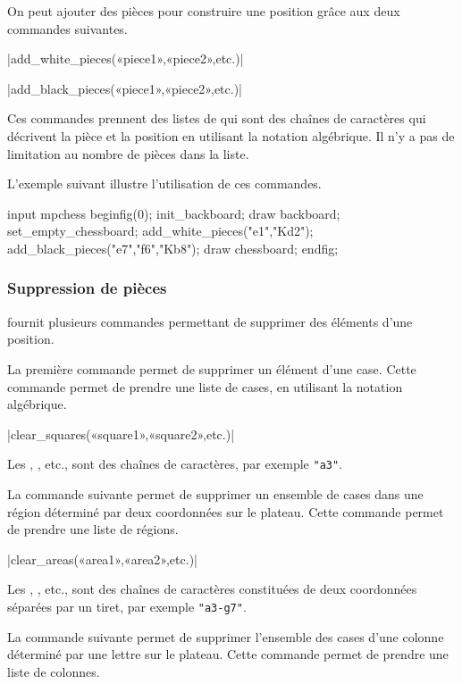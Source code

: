 \documentclass[french]{ltxdoc}
\begin{document}
On peut ajouter des pièces pour construire une position grâce aux deux commandes suivantes.

\commande|add_white_pieces(«piece1»,«piece2»,etc.)|\smallskip


\commande|add_black_pieces(«piece1»,«piece2»,etc.)|\smallskip

Ces commandes prennent des listes de \textbf{} qui sont des chaînes
de caractères qui décrivent la pièce et la position en utilisant la notation
algébrique. Il n’y a pas de limitation au nombre de pièces dans la liste.

L’exemple suivant illustre l’utilisation de ces commandes.
\begin{ExempleMP}
input mpchess
beginfig(0);
init_backboard;
draw backboard;
set_empty_chessboard;
add_white_pieces("e1","Kd2");
add_black_pieces("e7","f6","Kb8");
draw chessboard;
endfig;
\end{ExempleMP}


\subsubsection{Suppression de pièces}

\mpchess fournit plusieurs commandes permettant de supprimer des éléments d’une position.

La première commande permet de supprimer un élément d’une case. Cette commande permet de prendre une liste de cases, en utilisant la notation algébrique.

\commande|clear_squares(«square1»,«square2»,etc.)|\smallskip

Les \textbf{}, \textbf{}, etc., sont des chaînes de caractères, par exemple \lstinline+"a3"+.
\medskip

La commande suivante permet de supprimer un ensemble de cases dans une région
déterminé par deux coordonnées sur le plateau. Cette commande permet de prendre
une liste de régions.

\commande|clear_areas(«area1»,«area2»,etc.)|\smallskip

Les \textbf{}, \textbf{}, etc., sont des chaînes de caractères constituées de deux coordonnées séparées par un tiret, par exemple \lstinline+"a3-g7"+.
\medskip

La commande suivante permet de supprimer l’ensemble des cases d’une colonne
déterminé par une lettre sur le plateau. Cette commande permet de prendre
une liste de colonnes.
\end{document}
